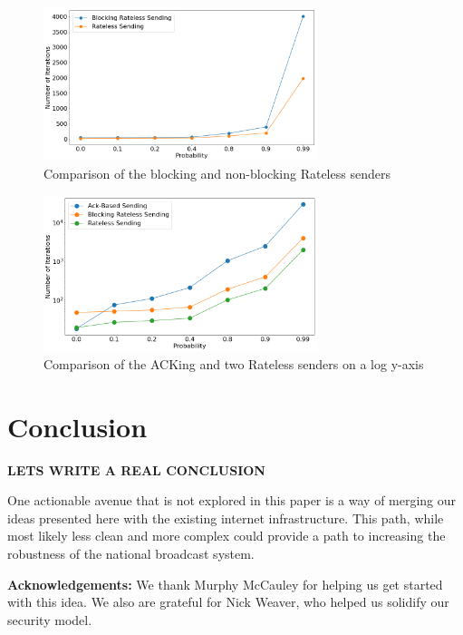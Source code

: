 \begin{figure}[tp]
\centering
\noindent
\includegraphics[width=8cm]{figures/big_font/block_comp.png}
\caption{Comparison of the blocking and non-blocking Rateless senders}
\label{graph:blockingvsnot}
\end{figure}

\begin{figure}[tp]
\centering
\noindent
\includegraphics[width=8cm]{figures/big_font/triple_comp.png}
\caption{Comparison of the ACKing and two Rateless senders on a log y-axis}
\label{graph:ackvsratelessLOG}
\end{figure}

\section{Conclusion}
\textbf{LETS WRITE A REAL CONCLUSION}


One actionable avenue that is not explored in this paper is a way of merging our ideas presented here with the existing internet infrastructure. This path, while most likely less clean and more complex could provide a path to  increasing the robustness of the national broadcast system.


\textbf{Acknowledgements:} We thank Murphy McCauley for helping us get started with this idea. We also are grateful for Nick Weaver, who helped us solidify our security model.


